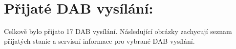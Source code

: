 \documentclass[10pt, a4paper]{article}%
\begin{document}
\section{\Large Přijaté DAB vysílání:}
Celkově bylo přijato 17 DAB vysílání. Následující obrázky zachycují seznam přijatých stanic a servisní informace
pro vybrané DAB vysílání.
%    




\end{document}
